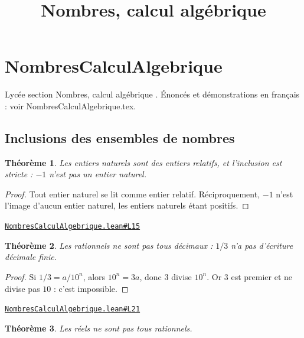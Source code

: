 \documentclass[11pt,a4paper]{article}
\title{Nombres, calcul algébrique}
\date{}
\theoremstyle{definition}
\theoremstyle{plain}
\newtheorem{theoreme}{Théorème}
\newcommand{\source}[2]{\par\smallskip\noindent\hfill{\footnotesize\href{#1}{\texttt{#2}}}\par\smallskip}
\begin{document}
\maketitle
\sloppy

\section{NombresCalculAlgebrique}

\noindent
Lycée \textemdash{} section \og{} Nombres, calcul algébrique \fg{}.
Énoncés et démonstrations en français : voir NombresCalculAlgebrique.tex.

\subsection{Inclusions des ensembles de nombres}

\begin{theoreme}
Les entiers naturels sont des entiers relatifs, et l'inclusion est stricte : $-1$ n'est
pas un entier naturel.
\end{theoreme}

\begin{proof}
Tout entier naturel se lit comme entier relatif. Réciproquement, $-1$ n'est l'image
d'aucun entier naturel, les entiers naturels étant positifs.
\end{proof}
\source{https://github.com/Commutator-IO/learn-lean/blob/main/cours/02-lycee/01-nombres-calcul-algebrique/NombresCalculAlgebrique.lean\#L15}{NombresCalculAlgebrique.lean\#L15}

\begin{theoreme}
Les rationnels ne sont pas tous décimaux : $1/3$ n'a pas d'écriture décimale finie.
\end{theoreme}

\begin{proof}
Si $1/3 = a/10^n$, alors $10^n = 3a$, donc $3$ divise $10^n$. Or $3$ est premier et ne
divise pas $10$ : c'est impossible.
\end{proof}
\source{https://github.com/Commutator-IO/learn-lean/blob/main/cours/02-lycee/01-nombres-calcul-algebrique/NombresCalculAlgebrique.lean\#L21}{NombresCalculAlgebrique.lean\#L21}

\begin{theoreme}
Les réels ne sont pas tous rationnels.
\end{theoreme}
\end{document}
